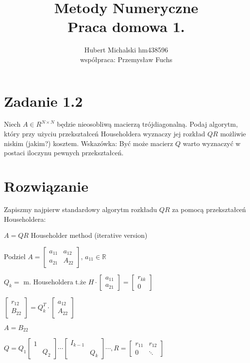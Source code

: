 \documentclass[a4paper]{article}
\title{\vspace{-1cm}
    Metody Numeryczne \\
    \large Praca domowa 1.
}
\author{
    Hubert Michalski hm438596 \\
    \small współpraca: Przemysław Fuchs
}
\newcommand{\R}{\mathbb R} %
\begin{document}
\maketitle

\section*{Zadanie 1.2}

Niech $A \in R^{N \times N}$ będzie nieosobliwą macierzą trójdiagonalną. Podaj algorytm, który przy użyciu przekształceń Householdera wyznaczy jej rozkład $QR$ możliwie niskim (jakim?) kosztem. \newline Wskazówka: Być może macierz $Q$ warto wyznaczyć w postaci iloczynu pewnych przekształceń.

\section*{\large Rozwiązanie}

Zapiszmy najpierw standardowy algorytm rozkładu $QR$ za pomocą przekształceń Householdera:

\begin{algorithm}
	\begin{algorithmic}[1]
		\caption{$A=QR$ Householder method (iterative version)}\label{alg:cap2}
		\State Podziel $A=\begin{bmatrix}
		a_{11} & a_{12}\\
		a_{21} & A_{22}
		\end{bmatrix}$, $a_{11} \in \R$

		\State $Q_k =$ m. Householdera t.że $H\cdot \begin{bmatrix}
		a_{11} \\
		a_{21}
		\end{bmatrix} = \begin{bmatrix}
		r_{kk} \\
		0
		\end{bmatrix}$

		\State $\begin{bmatrix}
		r_{12} \\
		B_{22}
		\end{bmatrix} = Q_{k}^{T} \cdot \begin{bmatrix}
		a_{12} \\
		A_{22}
		\end{bmatrix}$

		\State $A = B_{22}$
		\EndFor

		\State \Return $Q = Q_1 \begin{bmatrix}
		1 & \\
		& Q_2
		\end{bmatrix} \cdots \begin{bmatrix}
		I_{k-1} & \\
		& Q_k
		\end{bmatrix} \cdots, R = \begin{bmatrix}
		r_{11} & r_{12} \\
		0 & \ddots
		\end{bmatrix}$
	\end{algorithmic}\label{alg:algorithm2}
\end{algorithm}
\end{document}
